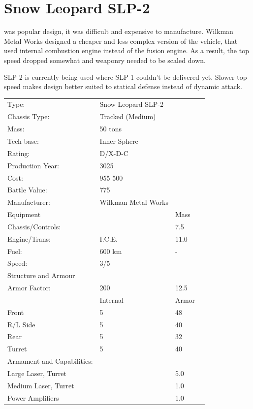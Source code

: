 \documentclass{tufte-book}
\begin{document}
\section{Snow Leopard SLP-2}

 was popular design, it was difficult and expensive to
manufacture. Wilkman Metal Works designed a cheaper and less complex version
of the vehicle, that used internal combustion engine instead of the fusion
engine. As a result, the top speed dropped somewhat and weaponry needed to be
scaled down.

SLP-2 is currently being used where SLP-1 couldn't be delivered yet. Slower
top speed makes design better suited to statical defense instead of dynamic
attack.

\bigskip
\begin{table}
\begin{minipage}{\textwidth}
\begin{center}
\begin{tabular}{llll}
\toprule
Type: & Snow Leopard SLP-2 & \\
Chassis Type: & Tracked (Medium) & \\
Mass: & 50 tons & \\
Tech base: & Inner Sphere & \\
Rating: & D/X-D-C & \\
Production Year: & 3025 & \\
Cost: & 955 500 & \\
Battle Value: & 775 & \\
Manufacturer: & Wilkman Metal Works & \\
Equipment & & Mass \\
\quad Chassis/Controls: & & 7.5 \\
\quad Engine/Trans: & I.C.E. & 11.0 \\
\quad Fuel: & 600 km & - \\
\quad Speed: & \multicolumn{2}{l}{3/5} \\
Structure and Armour & & \\
\quad Armor Factor: & 200 & 12.5 \\
\quad & Internal & Armor \\
\quad Front & 5 & 48 \\
\quad R/L Side & 5 & 40 \\
\quad Rear & 5 & 32 \\
\quad Turret & 5 & 40 \\

Armament and Capabilities: & & \\
\multicolumn{2}{l}{\quad Large Laser, Turret} & 5.0 \\
\multicolumn{2}{l}{\quad Medium Laser, Turret} & 1.0 \\
\multicolumn{2}{l}{\quad Power Amplifiers} & 1.0 \\


\end{tabular}
\end{center}
\end{minipage}
\end{table}
\end{document}
